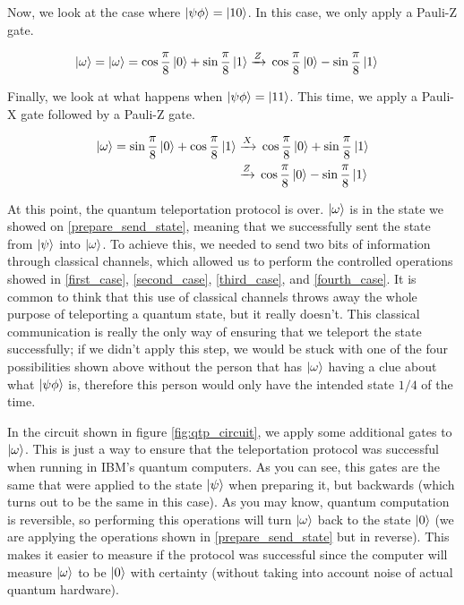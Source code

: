 \documentclass[]{article}
\newcommand\Xto{\xrightarrow{X}}
\newcommand\Zto{\xrightarrow{Z}}
\begin{document}
Now, we look at the case where $\ket{\psi\phi}=\ket{10}$. In this case, we only apply a Pauli-Z gate. 

\begin{align} \label{third_case}
    \ket{\omega}=\ket{\omega}&=\cos{\frac{\pi}{8}}\ket{0} + \sin{\frac{\pi}{8}}\ket{1} \Zto{} \cos{\frac{\pi}{8}}\ket{0} - \sin{\frac{\pi}{8}}\ket{1}
\end{align}

Finally, we look at what happens when $\ket{\psi\phi}=\ket{11}$. This time, we apply a Pauli-X gate followed by a Pauli-Z gate.

\begin{align} 
    \ket{\omega}=\sin{\frac{\pi}{8}}\ket{0} + \cos{\frac{\pi}{8}}\ket{1} &\Xto{} \cos{\frac{\pi}{8}}\ket{0} + \sin{\frac{\pi}{8}}\ket{1} \\
    &\Zto{} \cos{\frac{\pi}{8}}\ket{0} - \sin{\frac{\pi}{8}}\ket{1} \label{fourth_case}
\end{align}

At this point, the quantum teleportation protocol is over. $\ket{\omega}$ is in the state we showed on \eqref{prepare_send_state}, meaning that we successfully sent the state from $\ket{\psi}$ into $\ket{\omega}$. To achieve this, we needed to send two bits of information through classical channels, which allowed us to perform the controlled operations showed in \eqref{first_case}, \eqref{second_case}, \eqref{third_case}, and \eqref{fourth_case}. It is common to think that this use of classical channels throws away the whole purpose of teleporting a quantum state, but it really doesn't. This classical communication is really the only way of ensuring that we teleport the state successfully; if we didn't apply this step, we would be stuck with one of the four possibilities shown above without the person that has $\ket{\omega}$ having a clue about what $\ket{\psi\phi}$ is, therefore this person would only have the intended state $1/4$ of the time.

In the circuit shown in figure \ref{fig:qtp_circuit}, we apply some additional gates to $\ket{\omega}$. This is just a way to ensure that the teleportation protocol was successful when running in IBM's quantum computers. As you can see, this gates are the same that were applied to the state $\ket{\psi}$ when preparing it, but backwards (which turns out to be the same in this case). As you may know, quantum computation is reversible, so performing this operations will turn $\ket{\omega}$ back to the state $\ket{0}$ (we are applying the operations shown in \eqref{prepare_send_state} but in reverse). This makes it easier to measure if the protocol was successful since the computer will measure $\ket{\omega}$ to be $\ket{0}$ with certainty (without taking into account noise of actual quantum hardware). 
\end{document}
